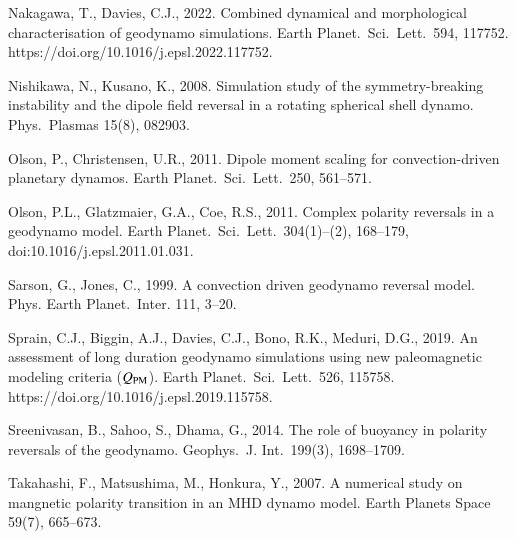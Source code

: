 \begin{list}
%
\item
\sloppy
Nakagawa, T., Davies, C.J., 2022. Combined dynamical and morphological characterisation of geodynamo simulations. Earth Planet.\ Sci.\ Lett.\ 594, 117752. https://doi.org/10.1016/j.epsl.2022.117752. 
%
\item
Nishikawa, N., Kusano, K., 2008. Simulation study of the symmetry-breaking instability and the dipole field reversal in a rotating spherical shell dynamo. Phys.\ Plasmas 15(8), 082903.
%
%
\item 
Olson, P., Christensen, U.R., 2011. Dipole moment scaling for convection-driven planetary dynamos. Earth Planet.\ Sci.\ Lett.\ 250, 561--571.
%
\item
\sloppy
Olson, P.L., Glatzmaier, G.A., Coe, R.S., 2011. Complex polarity reversals in a geodynamo model. Earth Planet.\ Sci.\ Lett.\ 304(1)--(2), 168--179, doi:10.1016/j.epsl.2011.01.031.
%
\item
Sarson, G., Jones, C., 1999. A convection driven geodynamo reversal model. Phys. Earth Planet.\ Inter. 111, 3--20.
%
%
\item 
Sprain, C.J., Biggin, A.J., Davies, C.J., Bono, R.K., Meduri, D.G., 2019. An assessment of long duration geodynamo simulations using new paleomagnetic modeling criteria ($Q_{\rm PM}$). Earth Planet.\ Sci.\ Lett.\ 526, 115758. https://doi.org/10.1016/j.epsl.2019.115758.
%
\item
Sreenivasan, B., Sahoo, S., Dhama, G., 2014. The role of buoyancy in polarity reversals of the geodynamo. Geophys.\ J. Int.\ 199(3), 1698--1709.
%
\item
Takahashi, F., Matsushima, M., Honkura, Y., 2007. A numerical study on mangnetic polarity transition in an MHD dynamo model. Earth Planets Space 59(7), 665--673.
%
\item

\end{list}

